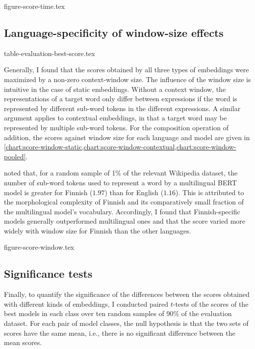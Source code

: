 {figure-score-time.tex}

\subsection{Language-specificity of window-size effects}
\label{sec:language-specificity}

{table-evaluation-best-score.tex}

Generally, I found that the scores obtained by all three types of embeddings were
maximized by a non-zero context-window size.
The influence of the window size is intuitive in the case of static embeddings.
Without a context window, the representations of a target word only differ between
expressions if the word is represented by different sub-word tokens in the different
expressions.
A similar argument applies to contextual embeddings, in that a target word may be
represented by multiple sub-word tokens.
For the composition operation of addition, the scores against window size for each
language and model are given in
\cref{chart:score-window-static,chart:score-window-contextual,chart:score-window-pooled}.

\textcite[3]{Virtanen2019} noted that, for a random sample of 1\% of the relevant
Wikipedia dataset, the number of sub-word tokens used to represent a word by a
multilingual BERT model is greater for Finnish ($1.97$) than for English ($1.16$).
This is attributed to the morphological complexity of Finnish and its comparatively
small fraction of the multilingual model's vocabulary.
Accordingly, I found that Finnish-specific models generally outperformed multilingual
ones and that the score varied more widely with window size for Finnish than the other
languages.

{figure-score-window.tex}

\subsection{Significance tests}
\label{sec:significance}

Finally, to quantify the significance of the differences between the scores obtained
with different kinds of embeddings, I conducted paired $t$-tests of the scores of the
best models in each class over ten random samples of 90\% of the evaluation dataset.
For each pair of model classes, the null hypothesis is that the two sets of scores have
the same mean, i.e., there is no significant difference between the mean scores.
\\
